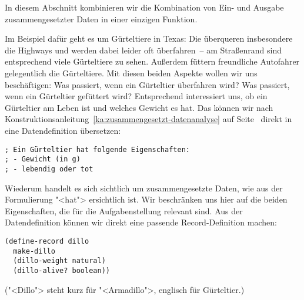 In diesem Abschnitt kombinieren wir die Kombination von Ein- und
Ausgabe zusammengesetzter Daten in einer einzigen Funktion.

Im Beispiel dafür geht es um Gürteltiere in Texas:
Die überqueren insbesondere die Highways
und werden dabei leider oft überfahren~-- am Straßenrand
sind entsprechend viele Gürteltiere zu sehen.  Außerdem füttern
freundliche Autofahrer gelegentlich die Gürteltiere.  Mit diesen
beiden Aspekte wollen wir uns beschäftigen: Was passiert, wenn ein
Gürteltier überfahren wird?  Was passiert, wenn ein Gürteltier
gefüttert wird?  Entsprechend interessiert uns, ob ein Gürteltier am
Leben ist und welches Gewicht es hat.  Das können wir nach
Konstruktionsanleitung~\ref{ka:zusammengesetzt-datenanalyse} auf
Seite~\pageref{ka:zusammengesetzt-datenanalyse} direkt in eine
Datendefinition übersetzen:
%
\begin{lstlisting}
; Ein Gürteltier hat folgende Eigenschaften:
; - Gewicht (in g)
; - lebendig oder tot
\end{lstlisting}
%
Wiederum handelt es sich sichtlich um zusammengesetzte Daten, wie
aus der Formulierung "<hat"> ersichtlich ist.  Wir beschränken uns
hier auf die beiden Eigenschaften, die für die Aufgabenstellung
relevant sind.
Aus der Datendefinition können wir direkt eine passende
Record-Definition machen:
% 
\begin{lstlisting}
(define-record dillo
  make-dillo
  (dillo-weight natural)
  (dillo-alive? boolean))
\end{lstlisting}
%
("<Dillo"> steht kurz für "<Armadillo">, englisch für Gürteltier.)

